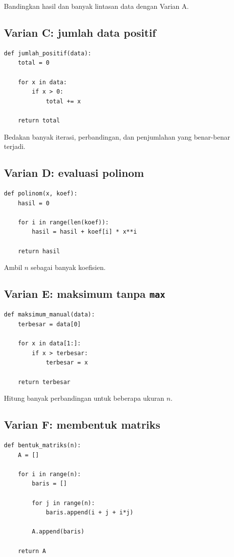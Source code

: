 \documentclass[11pt,a4paper]{report}
\begin{document}
Bandingkan hasil dan banyak lintasan data dengan Varian A.

\subsection*{Varian C: jumlah data positif}

\begin{lstlisting}
def jumlah_positif(data):
    total = 0

    for x in data:
        if x > 0:
            total += x

    return total
\end{lstlisting}

Bedakan banyak iterasi, perbandingan, dan penjumlahan yang benar-benar terjadi.

\subsection*{Varian D: evaluasi polinom}

\begin{lstlisting}
def polinom(x, koef):
    hasil = 0

    for i in range(len(koef)):
        hasil = hasil + koef[i] * x**i

    return hasil
\end{lstlisting}

Ambil $n$ sebagai banyak koefisien.

\subsection*{Varian E: maksimum tanpa \texttt{max}}

\begin{lstlisting}
def maksimum_manual(data):
    terbesar = data[0]

    for x in data[1:]:
        if x > terbesar:
            terbesar = x

    return terbesar
\end{lstlisting}

Hitung banyak perbandingan untuk beberapa ukuran $n$.

\subsection*{Varian F: membentuk matriks}

\begin{lstlisting}
def bentuk_matriks(n):
    A = []

    for i in range(n):
        baris = []

        for j in range(n):
            baris.append(i + j + i*j)

        A.append(baris)

    return A
\end{lstlisting}
\end{document}
